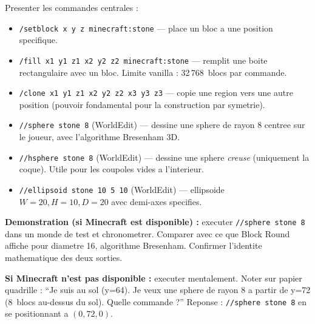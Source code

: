 \documentclass[12pt,a4paper]{scrartcl}
\newcommand{\cmd}[1]{\textcolor{earth}{\texttt{\small #1}}}
\newcommand{\tempo}[1]{\textnormal{\footnotesize\color{bg!90!white}\textsf{#1}}}
\begin{document}
\begin{activite}[4.2 --- Commandes Minecraft \quad\tempo{15 min}]\label{at:42}
Presenter les commandes centrales :

\begin{itemize}[leftmargin=1.4em,itemsep=0.25em,topsep=0.3em]
  \item \cmd{/setblock x y z minecraft:stone} --- place un bloc a une position specifique.
  \item \cmd{/fill x1 y1 z1 x2 y2 z2 minecraft:stone} --- remplit une boite rectangulaire avec un bloc. Limite vanilla : 32\,768~blocs par commande.
  \item \cmd{/clone x1 y1 z1 x2 y2 z2 x3 y3 z3} --- copie une region vers une autre position (pouvoir fondamental pour la construction par symetrie).
  \item \cmd{//sphere stone 8} (WorldEdit) --- dessine une sphere de rayon 8 centree sur le joueur, avec l'algorithme Bresenham 3D.
  \item \cmd{//hsphere stone 8} (WorldEdit) --- dessine une sphere \emph{creuse} (uniquement la coque). Utile pour les coupoles vides a l'interieur.
  \item \cmd{//ellipsoid stone 10 5 10} (WorldEdit) --- ellipsoide $W = 20, H = 10, D = 20$ avec demi-axes specifies.
\end{itemize}

\textbf{Demonstration (si Minecraft est disponible) :} executer \cmd{//sphere stone 8} dans un monde de test et chronometrer. Comparer avec ce que Block Round affiche pour diametre 16, algorithme Bresenham. Confirmer l'identite mathematique des deux sorties.

\textbf{Si Minecraft n'est pas disponible :} executer mentalement. Noter sur papier quadrille : \enquote{Je suis au sol (y=64). Je veux une sphere de rayon 8 a partir de y=72 (8~blocs au-dessus du sol). Quelle commande ?} Reponse : \cmd{//sphere stone 8} en se positionnant a $(0, 72, 0)$.
\end{activite}
\end{document}
